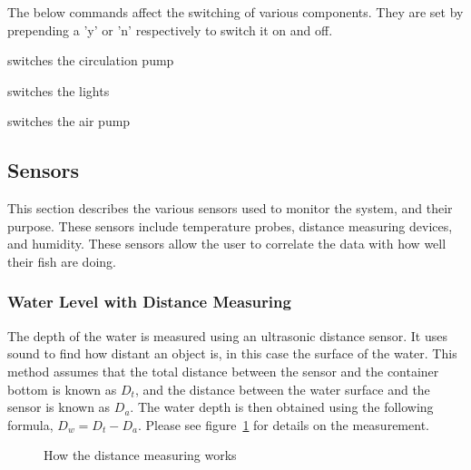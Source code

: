 \documentclass[american,12pt]{article}
\begin{document}
The below commands affect the switching of various components. They are set by
prepending a 'y' or 'n' respectively to switch it on and off.

\begin{description}[style=nextline]
    \item[CiPump] switches the circulation pump
    \item[Lights] switches the lights
    \item[AirPmp] switches the air pump
\end{description}




\subsection{Sensors}
This section describes the various sensors used to monitor the system, and their
purpose. These sensors include temperature probes, distance measuring devices,
and humidity. These sensors allow the user to correlate the data with how well
their fish are doing.

\subsubsection{Water Level with Distance Measuring}
The depth of the water is measured using an ultrasonic distance sensor. It uses
sound to find how distant an object is, in this case the surface of the water.
This method assumes that the total distance between the sensor and the container
bottom is known as $D_t$, and the distance between the water surface and the sensor
is known as $D_a$. The water depth is then obtained using the following formula,
$D_w = D_t - D_a$. Please see figure~\ref{fig:distance measuring} for details on the
measurement.

\begin{figure}[h]
    \centering
    \caption{How the distance measuring works}
    \label{fig:distance measuring}
\end{figure}
\end{document}
